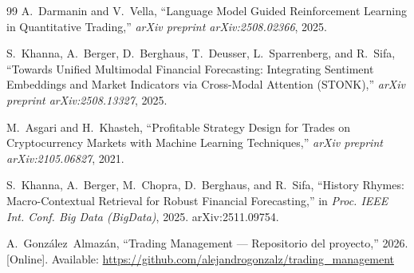 \documentclass[10pt,twocolumn]{article}
\begin{document}
\begin{thebibliography}{99}
A.~Darmanin and V.~Vella, ``Language Model Guided Reinforcement Learning in Quantitative Trading,'' \textit{arXiv preprint arXiv:2508.02366}, 2025.

S.~Khanna, A.~Berger, D.~Berghaus, T.~Deusser, L.~Sparrenberg, and R.~Sifa, ``Towards Unified Multimodal Financial Forecasting: Integrating Sentiment Embeddings and Market Indicators via Cross-Modal Attention (STONK),'' \textit{arXiv preprint arXiv:2508.13327}, 2025.

M.~Asgari and H.~Khasteh, ``Profitable Strategy Design for Trades on Cryptocurrency Markets with Machine Learning Techniques,'' \textit{arXiv preprint arXiv:2105.06827}, 2021.

S.~Khanna, A.~Berger, M.~Chopra, D.~Berghaus, and R.~Sifa, ``History Rhymes: Macro-Contextual Retrieval for Robust Financial Forecasting,'' in \textit{Proc. IEEE Int. Conf. Big Data (BigData)}, 2025. arXiv:2511.09754.

A.~Gonz\'alez~Almaz\'an, ``Trading Management --- Repositorio del proyecto,'' 2026. [Online]. Available: \url{https://github.com/alejandrogonzalz/trading_management}

\end{thebibliography}
\end{document}
